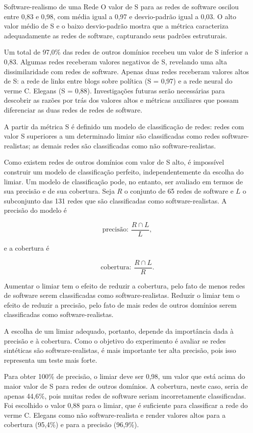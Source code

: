 \begin{section}{Software-realismo de uma Rede}
O valor de S para as redes de software oscilou entre 0,83 e 0,98, com média igual a 0,97 e desvio-padrão igual a 0,03. O alto valor médio de S e o baixo desvio-padrão mostra que a métrica caracteriza adequadamente as redes de software, capturando seus padrões estruturais.

Um total de 97,0\% das redes de outros domínios recebeu um valor de S inferior a 0,83. Algumas redes receberam valores negativos de S, revelando uma alta dissimilaridade com redes de software. Apenas duas redes receberam valores altos de S: a rede de links entre blogs sobre política (S = 0,97) e a rede neural do verme C. Elegans (S = 0,88). Investigações futuras serão necessárias para descobrir as razões por trás dos valores altos e métricas auxiliares que possam diferenciar as duas redes de redes de software.

A partir da métrica S é definido um modelo de classificação de redes: redes com valor S superiores a um determinado limiar são classificadas como redes software-realistas; as demais redes são classificadas como não software-realistas.

Como existem redes de outros domínios com valor de S alto, é impossível construir um modelo de classificação perfeito, independentemente da escolha do limiar. Um modelo de classificação pode, no entanto, ser avaliado em termos de sua precisão e de sua cobertura. Seja $R$ o conjunto de 65 redes de software e $L$ o subconjunto das 131 redes que são classificadas como software-realistas. A precisão do modelo é

$$
\mbox{precisão}: ~\frac{R \cap L}{L},
$$

e a cobertura é

$$
\mbox{cobertura}: ~\frac{R \cap L}{R}.
$$

Aumentar o limiar tem o efeito de reduzir a cobertura, pelo fato de menos redes de software serem classificadas como software-realistas. Reduzir o limiar tem o efeito de reduzir a precisão, pelo fato de mais redes de outros domínios serem classificadas como software-realistas.

A escolha de um limiar adequado, portanto, depende da importância dada à precisão e à cobertura. Como o objetivo do experimento é avaliar se redes sintéticas são software-realistas, é mais importante ter alta precisão, pois isso representa um teste mais forte.

Para obter 100\% de precisão, o limiar deve ser 0,98, um valor que está acima do maior valor de S para redes de outros domínios. A cobertura, neste caso, seria de apenas 44,6\%, pois muitas redes de software seriam incorretamente classificadas. Foi escolhido o valor 0,88 para o limiar, que é suficiente para classificar a rede do verme C. Elegans como não software-realista e render valores altos para a cobertura (95,4\%) e para a precisão (96,9\%).

\end{section}

